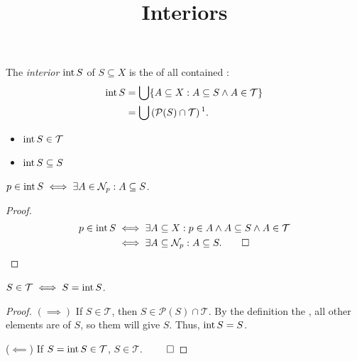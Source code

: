 \documentclass{atomic}
\title{Interiors}
\begin{document}
    \pagestyle{plain}  \noindent
    The \textit{interior} $\operatorname{int} S$ of $S \subseteq X$ is the  of all contained :
    \begin{align*}
        \inte S &= \bigcup \{ A \subseteq X : A \subseteq S \land A \in \mathcal{T} \} \\
                &= \bigcup \left( \mathcal{P}(S) \cap \mathcal{T} \right)\text{\footnotemark}.
    \end{align*}

    \begin{itemize}
        \item $\operatorname{int} S \in \mathcal{T}$
        \item $\operatorname{int} S \subseteq S$
    \end{itemize}

    \begin{characterisation*} \label{characterisation}
        $p \in \operatorname{int} S \iff \exists A \in \mathcal{N}_p : A \subseteq S$\footnotemark.
    \end{characterisation*}
    \begin{proof}
        \phantom{}\vspace{-2em}
        \begin{align*}
            p \in \operatorname{int} S &\iff \exists A \subseteq X : p \in A \land A \subseteq S \land A \in \mathcal{T} \\
            &\iff \exists A \subseteq \mathcal{N}_p : A \subseteq S. \qed
        \end{align*}
    \end{proof}

    \begin{theorem} \label{open}
        $S \in \mathcal{T} \iff S = \operatorname{int} S$.
    \end{theorem}
    \begin{proof}
        $\left( \implies \right)$
        If $S \in \mathcal{T}$, then $S \in \mathcal{P}(S) \cap \mathcal{T}$. By the definition the , all other elements are  of $S$, so  them will give $S$. Thus, $\operatorname{int} S = S$.
        
        ($\impliedby$)
        If $S = \operatorname{int} S \in \mathcal{T}$, $S \in \mathcal{T}$. $\qed$
    \end{proof}
    
\end{document}
